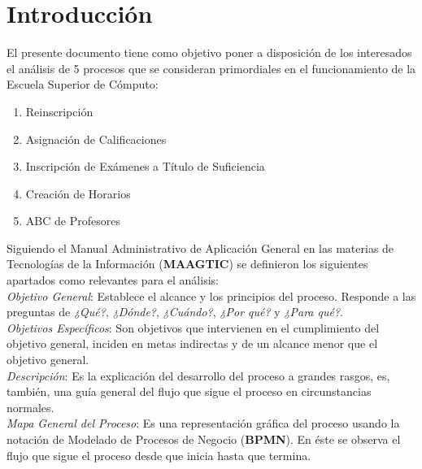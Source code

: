 \newpage
\section{Introducción}

    

   	
\begin{footnotesize}	
	El presente documento tiene como objetivo poner a disposición de los interesados el análisis de 5 procesos que se consideran primordiales en el funcionamiento de la Escuela Superior de Cómputo:\\

\begin{enumerate}
\item Reinscripción
\item Asignación de Calificaciones
\item Inscripción de Exámenes a Título de Suficiencia
\item Creación de Horarios
\item ABC de Profesores
\end{enumerate}

Siguiendo el Manual Administrativo de Aplicación General en las materias de Tecnologías de la Información (\textbf{MAAGTIC}) se definieron los siguientes apartados como relevantes para el análisis:\\

\textit{Objetivo General}: Establece el alcance y los principios del proceso. Responde a las preguntas de \textit{¿Qué?}, \textit{¿Dónde?}, \textit{¿Cuándo?}, \textit{¿Por qué?} y \textit{¿Para qué?}.\\

\textit{Objetivos Específicos}: Son objetivos que intervienen en el cumplimiento del objetivo general, inciden en metas indirectas y de un alcance menor que el objetivo general.\\

\textit{Descripción}: Es la explicación del desarrollo del proceso a grandes rasgos, es, también, una guía general del flujo que sigue el proceso en circunstancias normales.\\

\textit{Mapa General del Proceso}: Es una representación gráfica del proceso usando la notación de Modelado de Procesos de Negocio (\textbf{BPMN}). En éste se observa el flujo que sigue el proceso desde que inicia hasta que termina.\\


\end{footnotesize}
